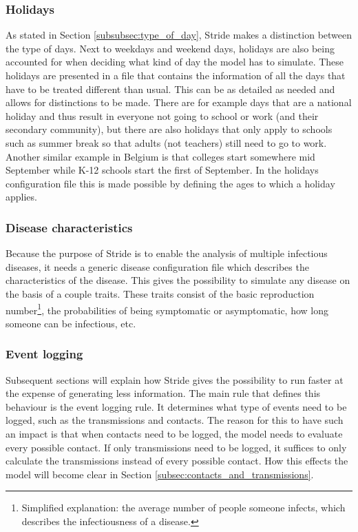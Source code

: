 \subsubsection{Holidays}
As stated in Section \ref{subsubsec:type_of_day}, Stride makes a distinction between the type of days. Next to weekdays and weekend days, holidays are also being accounted for when deciding what kind of day the model has to simulate. These holidays are presented in a file that contains the information of all the days that have to be treated different than usual. This can be as detailed as needed and allows for distinctions to be made. There are for example days that are a national holiday and thus result in everyone not going to school or work (and their secondary community), but there are also holidays that only apply to schools such as summer break so that adults (not teachers) still need to go to work. Another similar example in Belgium is that colleges start somewhere mid September while K-12 schools start the first of September. In the holidays configuration file this is made possible by defining the ages to which a holiday applies.

\subsubsection{Disease characteristics}
Because the purpose of Stride is to enable the analysis of multiple infectious diseases, it needs a generic disease configuration file which describes the characteristics of the disease. This gives the possibility to simulate any disease on the basis of a couple traits. These traits consist of the basic reproduction number\footnote{Simplified explanation: the average number of people someone infects, which describes the infectiousness of a disease.}, the probabilities of being symptomatic or asymptomatic, how long someone can be infectious, etc.

\subsubsection{Event logging}
Subsequent sections will explain how Stride gives the possibility to run faster at the expense of generating less information. The main rule that defines this behaviour is the event logging rule. It determines what type of events need to be logged, such as the transmissions and contacts. The reason for this to have such an impact is that when contacts need to be logged, the model needs to evaluate every possible contact. If only transmissions need to be logged, it suffices to only calculate the transmissions instead of every possible contact. How this effects the model will become clear in Section \ref{subsec:contacts_and_transmissions}.

